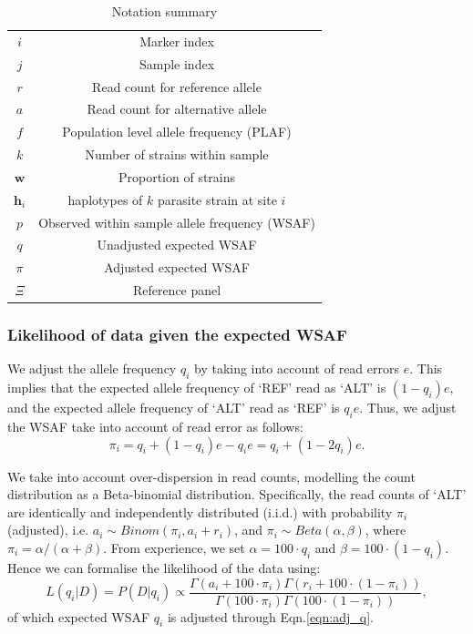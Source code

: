 \documentclass{bioinfo}
\begin{document}
\begin{table}[h]\centering
\begin{tabular}{c|c}\hline
$i$              & Marker index\\
$j$              & Sample index \\
$r$              & Read count for reference allele \\
$a$              & Read count for alternative allele \\
$f$              & Population level allele frequency (PLAF) \\
$k$              & Number of strains within sample \\
$\mathbf w$      & Proportion of strains \\
$\mathbf{h}_{i}$ & haplotypes of $k$ parasite strain at site $i$ \\
$p$              & Observed within sample allele frequency (WSAF) \\
$q$              & Unadjusted expected WSAF  \\
$\pi$            & Adjusted expected WSAF \\
$\Xi$            & Reference panel\\ \hline
\end{tabular}
\caption{Notation summary}\label{tab:notation}
\end{table}

\subsubsection{Likelihood of data given the expected WSAF}

We adjust the allele frequency $q_i$ by taking into account of read errors $e$. This implies that the expected allele frequency of `REF' read as `ALT' is $(1 - q_i)e$, and the expected allele frequency of `ALT' read as `REF' is $q_ie$. Thus, we adjust the WSAF take into account of read error as follows:
\begin{equation}
\pi_i = q_i + (1 - q_i)e - q_ie = q_i + (1 - 2q_i)e.\label{eqn:adj_q}
\end{equation}

We take into account over-dispersion in read counts, modelling the count distribution as a Beta-binomial distribution. Specifically, the read counts of `ALT' are identically and independently distributed (i.i.d.) with probability $\pi_{i}$ (adjusted), i.e. $a_i \sim Binom(\pi_{i}, a_i + r_i)$, and $\pi_{i}\sim Beta(\alpha, \beta)$, where $\pi_{i} = \alpha/(\alpha+\beta)$. From experience, we set $\alpha = 100\cdot q_{i} $ and $\beta = 100\cdot (1-q_{i})$. Hence we can formalise the likelihood of the data using:
\begin{equation}
L(q_{i} | D) = P(D|q_{i}) \propto \frac{\Gamma(a_i + 100\cdot \pi_{i}) \Gamma(r_i + 100\cdot (1-\pi_{i}))}{\Gamma(100\cdot \pi_{i})\Gamma(100\cdot (1-\pi_{i}))}, \label{eqn:llk}
\end{equation}
of which expected WSAF $q_i$ is adjusted through Eqn.\eqref{eqn:adj_q}.
\end{document}
